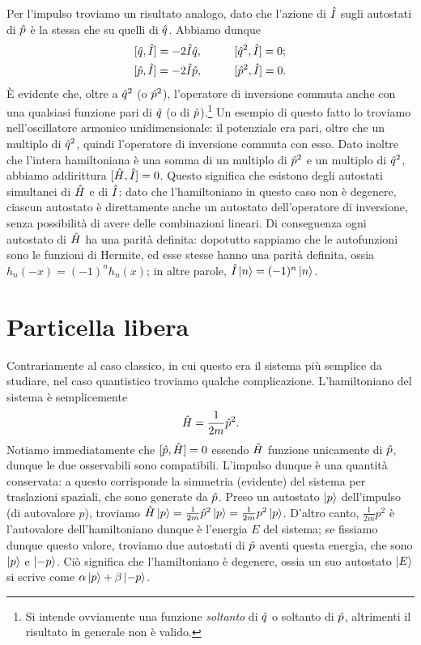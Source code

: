 Per l'impulso troviamo un risultato analogo, dato che l'azione di $\hat{I}$ sugli autostati di $\hat{p}$ è la stessa che su quelli di $\hat{q}$.
Abbiamo dunque
\begin{equation}
	\begin{gathered}
		[\op q,\op I]=-2\op I\op q,\hspace{1cm}[\op q^2,\op I]=0;\\
		[\op p,\op I]=-2\op I\op p,\hspace{1cm}[\op p^2,\op I]=0.
	\end{gathered}
	\label{eq:commutatori-inversione-posizione-impulso}
\end{equation}
È evidente che, oltre a $\hat{q}^2$ (o $\hat{p}^2$), l'operatore di inversione commuta anche con una qualsiasi funzione pari di $\hat{q}$ (o di $\hat{p}$).\footnote{Si intende ovviamente una funzione \emph{soltanto} di $\hat{q}$ o soltanto di $\hat{p}$, altrimenti il risultato in generale non è valido.}
Un esempio di questo fatto lo troviamo nell'oscillatore armonico unidimensionale: il potenziale era pari, oltre che un multiplo di $\hat{q}^2$, quindi l'operatore di inversione commuta con esso.
Dato inoltre che l'intera hamiltoniana è una somma di un multiplo di $\hat{p}^2$ e un multiplo di $\hat{q}^2$, abbiamo addirittura $[\hat{H},\hat{I}]=0$.
Questo significa che esistono degli autostati simultanei di $\hat{H}$ e di $\hat{I}$: dato che l'hamiltoniano in questo caso non è degenere, ciascun autostato è direttamente anche un autostato dell'operatore di inversione, senza possibilità di avere delle combinazioni lineari.
Di conseguenza ogni autostato di $\hat{H}$ ha una parità definita: dopotutto sappiamo che le autofunzioni sono le funzioni di Hermite, ed esse stesse hanno una parità definita, ossia $h_n(-x)=(-1)^nh_n(x)$; in altre parole, $\hat{I}\left|{n}\right\rangle=(-1)^n\left|{n}\right\rangle$.

\section{Particella libera}
Contrariamente al caso classico, in cui questo era il sistema più semplice da studiare, nel caso quantistico troviamo qualche complicazione.
L'hamiltoniano del sistema è semplicemente
\begin{equation}
	\hat{H}=\frac1{2m}\hat{p}^2.
	\label{eq:H-particella-libera}
\end{equation}
Notiamo immediatamente che $[\hat{p},\hat{H}]=0$ essendo $\hat{H}$ funzione unicamente di $\hat{p}$, dunque le due osservabili sono compatibili.
L'impulso dunque è una quantità conservata: a questo corrisponde la simmetria (evidente) del sistema per traslazioni spaziali, che sono generate da $\hat{p}$.
Preso un autostato $\left|{p}\right\rangle$ dell'impulso (di autovalore $p$), troviamo $\hat{H}\left|{p}\right\rangle=\frac1{2m}\hat{p}^2\left|{p}\right\rangle=\frac1{2m}p^2\left|{p}\right\rangle$.
D'altro canto, $\frac1{2m}p^2$ è l'autovalore dell'hamiltoniano dunque è l'energia $E$ del sistema; se fissiamo dunque questo valore, troviamo due autostati di $\hat{p}$ aventi questa energia, che sono $\left|{p}\right\rangle$ e $\left|{-p}\right\rangle$.
Ciò significa che l'hamiltoniano è degenere, ossia un suo autostato $\left|{E}\right\rangle$ si scrive come $\alpha\left|{p}\right\rangle+\beta\left|{-p}\right\rangle$.

